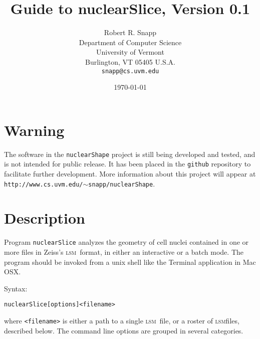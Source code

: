\documentclass[10pt]{article}
\title{Guide to nuclearSlice, Version 0.1}
\date{\today}
\author{Robert R. Snapp\\
Department of Computer Science\\
University of Vermont\\
Burlington, VT 05405 U.S.A.\\
\texttt{snapp@cs.uvm.edu}}
\newcommand{\LSM}{\textsc{lsm}}
\begin{document}
\maketitle

\setcounter{section}{-1}

\section{Warning}
The software in the \texttt{nuclearShape} project is still being developed and tested, and is not intended for public release.
It has been placed in the \texttt{github} repository to facilitate further development.
More information about this project will appear at \texttt{http://www.cs.uvm.edu/$\sim$snapp/nuclearShape}.


\section{Description}
Program \texttt{nuclearSlice} analyzes the geometry of cell nuclei
contained in one or more files in Zeiss's \LSM\ format, in either
an interactive or a batch mode. The program should be invoked from
a unix shell like the Terminal application in Mac OSX.

Syntax:

\begin{alltt}
nuclearSlice [options] <filename>
\end{alltt}

\noindent
where \texttt{<filename>} is either a path to a single \LSM\ file,
or a roster of \LSM files, described below. The command line options
are grouped in several categories. 
\end{document}
